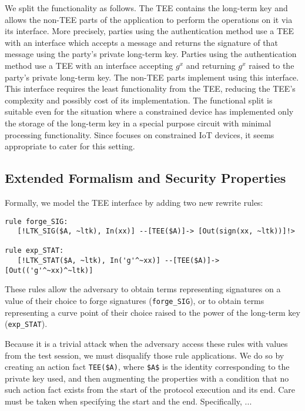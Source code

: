 \documentclass[runningheads]{llncs}
\begin{document}
We split the \mEdhoc{} functionality as follows.
%
The TEE contains the long-term key and allows the non-TEE parts of the
application to perform the operations on it via its interface.
%
More precisely, parties using the \mSig{} authentication method use a TEE with
an interface which accepts a message and returns the signature of that message
using the party's private long-term key.
%
Parties using the \mStat{} authentication method use a TEE with an interface
accepting $g^x$ and returning $g^x$ raised to the party's private long-term key.
%
The non-TEE parts implement \mEdhoc{} using this interface.
%
This interface requires the least functionality from the TEE, reducing the TEE's
complexity and possibly cost of its implementation.
%
The functional split is suitable even for the situation where a
constrained device has implemented only the storage of the long-term key in a
special purpose circuit with minimal processing functionality.
%
Since \mEdhoc{} focuses on constrained IoT devices, it seems appropriate to
cater for this setting.
%

\subsection{Extended Formalism and Security Properties}
\label{sec:TEE:fmAndProps}
Formally, we model the TEE interface by adding two new rewrite rules:
%
\begin{small}
\begin{verbatim}
rule forge_SIG:
   [!LTK_SIG($A, ~ltk), In(xx)] --[TEE($A)]-> [Out(sign(xx, ~ltk))]!>

rule exp_STAT:
   [!LTK_STAT($A, ~ltk), In('g'^~xx)] --[TEE($A)]-> [Out(('g'^~xx)^~ltk)]
\end{verbatim}
\end{small}
%
These rules allow the adversary to obtain terms representing signatures on a
value of their choice to forge signatures (\verb|forge_SIG|), or to obtain terms
representing a curve point of their choice raised to the power of the
long-term key (\verb|exp_STAT|).
%

Because it is a trivial attack when the adversary access these rules with values
from the test session, we must disqualify those rule applications.
%
We do so by creating an action fact \verb|TEE($A)|, where \verb|$A$| is the
identity corresponding to the private key used, and then augmenting the
properties with a condition that no such action fact exists from the start of
the protocol execution and its end.
%
Care must be taken when specifying the start and the end.
%
Specifically, ...
\end{document}
